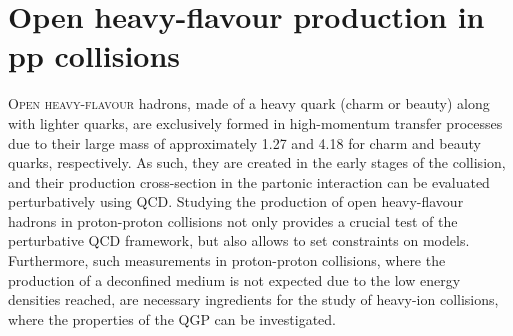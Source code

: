 \chapter{Open heavy-flavour production in pp collisions}

\lettrine[lines=6,findent=0.pt]{O}{pen heavy-flavour} hadrons, made of a heavy quark (charm or beauty) along with lighter quarks, are exclusively formed in high-momentum transfer processes due to their large mass of approximately 1.27 \gevcc and 4.18 \gevcc for charm and beauty quarks, respectively. As such, they are created in the early stages of the collision, and their production cross-section in the partonic interaction can be evaluated perturbatively using QCD. Studying the production of open heavy-flavour hadrons in proton-proton collisions not only provides a crucial test of the perturbative QCD framework, but also allows to set constraints on models. Furthermore, such measurements in proton-proton collisions, where the production of a deconfined medium is not expected due to the low energy densities reached, are necessary ingredients for the study of heavy-ion collisions, where the properties of the QGP can be investigated. 

